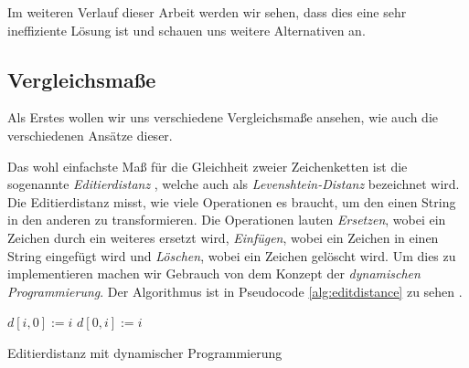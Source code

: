 \documentclass[sigconf]{acmart}
\DeclarePairedDelimiter\abs{\lvert}{\rvert}
\begin{document}
Im weiteren Verlauf dieser Arbeit werden wir sehen, dass dies eine sehr
ineffiziente Lösung ist und schauen uns weitere Alternativen an.


\subsection*{Vergleichsmaße}
Als Erstes wollen wir uns verschiedene Vergleichsmaße ansehen, 
wie auch die verschiedenen Ansätze dieser.

Das wohl einfachste Maß für die Gleichheit zweier Zeichenketten
ist die sogenannte \emph{Editierdistanz} \cite[Vgl. S. 2] {cohen2003comparison}, 
welche auch als \emph{Levenshtein-Distanz} bezeichnet wird.
Die Editierdistanz misst, wie viele Operationen es braucht, 
um den einen String in den anderen zu transformieren. 
Die Operationen lauten \emph{Ersetzen}, wobei ein Zeichen
durch ein weiteres ersetzt wird, \emph{Einfügen}, wobei ein
Zeichen in einen String eingefügt wird und \emph{Löschen}, 
wobei ein Zeichen gelöscht wird. Um dies zu implementieren 
machen wir Gebrauch von dem Konzept der 
\emph{dynamischen Programmierung}. Der Algorithmus ist
in Pseudocode \ref{alg:editdistance} zu sehen 
\cite[Vgl. S. 223] {bille2005survey}.

  \begin{algorithm}
    \begin{algorithmic}[1]
      
        \State $d[i,0] := i$
      \EndFor
        \State $d[0,i] := i$
      \EndFor

          \Else
          \EndIf
          \State {}
        \EndFor
      \EndFor
    
      \EndProcedure
      
    \end{algorithmic}
    \caption{Editierdistanz mit dynamischer Programmierung}
    \label{alg:editdistance}
    \end{algorithm}
\end{document}
